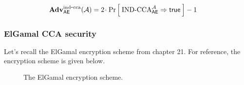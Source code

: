 \begin{center}
\end{center}

\begin{align*}
  \mathbf{Adv}^{\mathrm{ind\mbox{-} cca}}_{\textsf{AE}}({\mathcal A}) &= 2{\hspace{-0.1ex}}{\hspace{-0.1ex}}{\hspace{-0.1ex}}\cdot{\hspace{-0.1ex}}{\hspace{-0.1ex}}{\hspace{-0.1ex}}\Pr\left[\: \textnormal{IND-CCA}_{\textsf{AE}}^{\mathcal A}\Rightarrow\mathsf{true} \:\right] - 1
\end{align*}

\subsubsection*{ElGamal CCA security}

Let's recall the ElGamal encryption scheme from chapter 21. For reference, the encryption scheme is given below. 

\begin{figure}[H]
	\center
	\caption{The ElGamal encryption scheme.}
	\label{fig:elgamal}
\end{figure}

